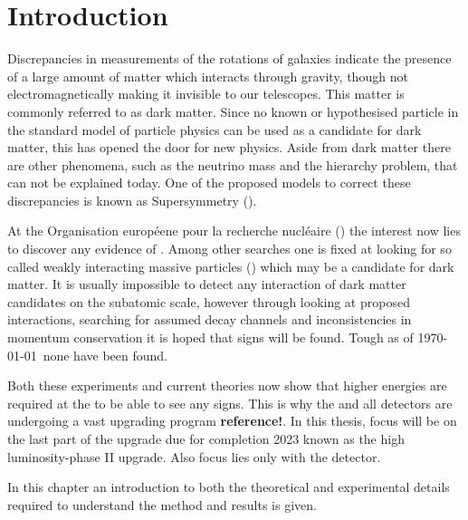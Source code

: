 \chapter{Introduction}\label{cha:intro}
Discrepancies in measurements of the rotations of galaxies indicate the presence of a large amount of matter which interacts through gravity, though not electromagnetically making it invisible to our telescopes. This matter is commonly referred to as dark matter. Since no known or hypothesised particle in the standard model of particle physics can be used as a candidate for dark matter, this has opened the door for new physics. Aside from dark matter there are other phenomena, such as the neutrino mass and the hierarchy problem, that can not be explained today. One of the proposed models to correct these discrepancies is known as Supersymmetry (\abbrSUSY).  

At the Organisation européene pour la recherche nucléaire (\abbrCERN) the interest now lies to discover any evidence of \abbrSUSY. Among other searches one is fixed at looking for so called weakly interacting massive particles (\abbrWIMPS) which may be a candidate for dark matter. It is usually impossible to detect any interaction of dark matter candidates on the subatomic scale, however through looking at proposed interactions, searching for assumed decay channels and inconsistencies in momentum conservation it is hoped that signs will be found. Tough as of \today\ none have been found. 

Both these experiments and current theories now show that higher energies are required at the \abbrLHC to be able to see any signs. This is why the \abbrLHC and all detectors are undergoing a vast upgrading program \textbf{reference!}.
In this thesis, focus will be on the last part of the upgrade due for completion 2023 known as the high luminosity-\abbrLHC phase II upgrade. Also focus lies only with the \abbrATLAS detector.

In this chapter an introduction to both the theoretical and experimental details required to understand the method and results is given. 

\newpage
